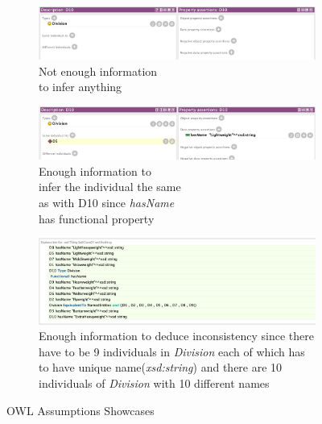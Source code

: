 \documentclass[a4paper]{article}
\begin{document}
\begin{figure}[H]
\centering
\begin{subfigure}{.3\textwidth}
	\centering
	\includegraphics[width=.9\linewidth]{resources/D10_unknown.png}
	\caption{Not enough information \\ to infer anything}
	\label{fig:d10_unknown}
\end{subfigure}%
\begin{subfigure}{.3\textwidth}
	\centering
	\includegraphics[width=.9\linewidth]{resources/D10_known.png}
	\caption{Enough information to \\ infer the individual the same \\ as with D10 since \textit{hasName} \\ has functional property}
	\label{fig:d10_known}
\end{subfigure}%
\begin{subfigure}{.3\textwidth}
	\centering
	\includegraphics[width=.9\linewidth]{resources/D10_inconsistent.png}
	\caption{Enough information to deduce inconsistency since there have to be 9 individuals in \textit{Division} each of which has to have unique name(\textit{xsd:string}) and there are 10 individuals of \textit{Division} with 10 different names}
	\label{fig:d10_inconsistent}
\end{subfigure}
\caption{OWL Assumptions Showcases}
\label{fig:owl_assumptions_showcases}
\end{figure}
\end{document}
